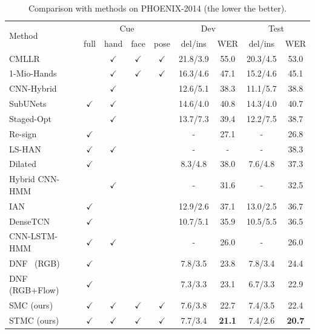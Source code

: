 \documentclass[letterpaper]{article} %
\def\gou{{$\checkmark$}}
\begin{document}
\begin{table}[tp]
    \centering
    \small
    \caption{Comparison with methods on PHOENIX-2014 (the lower the better).} \label{tab:phoenix2014}
    \begin{tabular*}{0.90\textwidth}{p{6.5cm}@{\extracolsep{\fill}}|cccc|cc|cc}
    \hline
    \multirow{2}{*}{Method}         &\multicolumn{4}{c|}{Cue}        & \multicolumn{2}{c|}{Dev} & \multicolumn{2}{c}{Test} \\
                                    & full & hand & face   & pose  & del/ins  & WER  & del/ins      & WER                  \\ \hline
    CMLLR~\cite{phoenixdataset2014} &      & \gou & \gou   & \gou  & 21.8/3.9 & 55.0 & 20.3/4.5 & 53.0      \\
    1-Mio-Hands~\cite{deephand}     &      & \gou & \gou   & \gou  & 16.3/4.6 & 47.1 & 15.2/4.6 & 45.1      \\
    CNN-Hybrid~\cite{deepsign}      &      & \gou &        &       & 12.6/5.1 & 38.3 & 11.1/5.7 & 38.8      \\
    SubUNets~\cite{subunet}         & \gou & \gou &        &       & 14.6/4.0 & 40.8 & 14.3/4.0 & 40.7      \\ 
    Staged-Opt~\cite{staged}        &      & \gou &        &       & 13.7/7.3 & 39.4 & 12.2/7.5 & 38.7      \\ 
    Re-sign~\cite{resign}           & \gou &      &        &       & -        & 27.1 & -        & 26.8      \\ 
    LS-HAN~\cite{han}               & \gou & \gou &        &       & -        & -    & -        & 38.3      \\ 
    Dilated~\cite{dilated}          & \gou &      &        &       & 8.3/4.8  & 38.0 & 7.6/4.8  & 37.3      \\ 
    Hybrid CNN-HMM~\cite{koller2018ijcv} &  &\gou  &       &       & -       & 31.6 & -        & 32.5      \\ 
    IAN~\cite{ian}                  & \gou &      &        &       & 12.9/2.6 & 37.1 & 13.0/2.5 & 36.7      \\ 
    DenseTCN~\cite{densetcn}        & \gou &      &        &       & 10.7/5.1 & 35.9 & 10.5/5.5 & 36.5      \\ 
    CNN-LSTM-HMM~\cite{tpami19}     & \gou & \gou &        &       & -        & 26.0 & -        & 26.0      \\ 
    DNF~\cite{cui-tmm19} (RGB)        & \gou &      &      &       & 7.8/3.5  & 23.8 & 7.8/3.4  & 24.4      \\ 
    DNF~\cite{cui-tmm19} (RGB+Flow)   & \gou &      &      &       & 7.3/3.3  & 23.1 & 6.7/3.3  & 22.9      \\ \hline 
    SMC  (ours)                     & \gou & \gou & \gou   &\gou   & 7.6/3.8  & 22.7 & 7.4/3.5  & 22.4      \\ 
    STMC (ours)                     & \gou & \gou & \gou   &\gou   & 7.7/3.4  & \textbf{21.1} & 7.4/2.6  & \textbf{20.7}      \\ \hline

    \end{tabular*}
\end{table}
\end{document}
